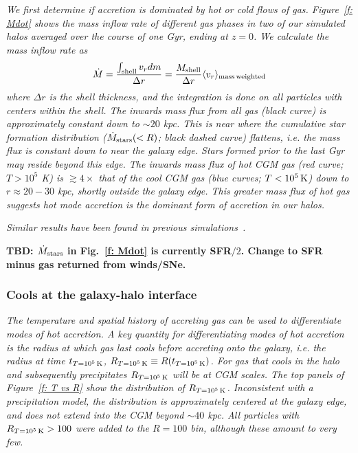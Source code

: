 \documentclass[fleqn,usenatbib]{mnras}
\newcommand{\Rcon}{R_{T=10^5\,{\rm K}}}
\newcommand{\tcon}{t_{T=10^5\,{\rm K}}}
\newcommand{\Mdot}{\dot{M}}
\begin{document}
\textit{
We first determine if accretion is dominated by hot or cold flows of gas.
Figure~\ref{f: Mdot} shows the mass inflow rate of different gas phases in two of our simulated halos averaged over the course of one Gyr, ending at $z=0$.
We calculate the mass inflow rate as
\begin{equation}
     \Mdot = \frac{\int_{\rm shell} v_r dm}{\Delta r} = \frac{M_{\rm shell}}{\Delta r} \langle v_r\rangle_{\rm mass\, weighted}
     \label{e: Mdot}
\end{equation}
where $\Delta r$ is the shell thickness, and the integration is done on all particles with centers within the shell.
The inwards mass flux from all gas (black curve) is approximately constant down to $\sim 20$ kpc.
This is near where the cumulative star formation distribution ($\dot M_{\rm stars}(<R)$; black dashed curve) flattens, i.e. the mass flux is constant down to near the galaxy edge.
Stars formed prior to the last Gyr may reside beyond this edge.
The inwards mass flux of hot CGM gas (red curve; $T>10^5$ K)  is $\gtrsim 4\times$ that of the cool CGM gas (blue curves; $T < 10^5\,{\rm K}$) down to $r \approx 20-30$ kpc, shortly outside the galaxy edge.
This greater mass flux of hot gas suggests hot mode accretion is the dominant form of accretion in our halos.
}

\textit{
Similar results have been found in previous simulations~\citep[e.g.][]{joung2012a}.
}

\textbf{TBD: $\dot{M}_{\rm stars}$ in Fig.~\ref{f: Mdot} is currently SFR$/2$. Change to SFR minus gas returned from winds/SNe.}


\subsubsection{Cools at the galaxy-halo interface}

\textit{
The temperature and spatial history of accreting gas can be used to differentiate modes of hot accretion.
A key quantity for differentiating modes of hot accretion is the radius at which gas last cools before accreting onto the galaxy, i.e. the radius at time $\tcon$, $\Rcon \equiv R (\tcon)$.
For gas that cools in the halo and subsequently precipitates $\Rcon$ will be at CGM scales.
The top panels of Figure~\ref{f: T vs R} show the distribution of  $\Rcon$.
Inconsistent with a precipitation model, the distribution is approximately centered at the galaxy edge, and does not extend into the CGM beyond $\sim 40$ kpc.
All particles with $\Rcon>100$  were added to the $R=100$ bin, although these amount to very few.
}
\end{document}
